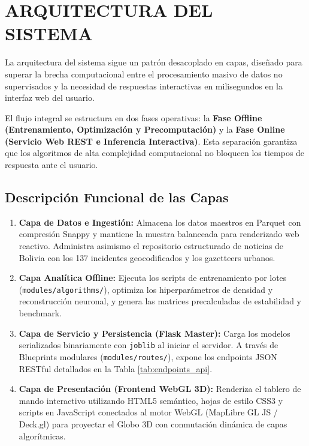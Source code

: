 \section{ARQUITECTURA DEL SISTEMA}

La arquitectura del sistema sigue un patrón desacoplado en capas, diseñado para superar la brecha computacional entre el procesamiento masivo de datos no supervisados y la necesidad de respuestas interactivas en milisegundos en la interfaz web del usuario.

El flujo integral se estructura en dos fases operativas: la \textbf{Fase Offline (Entrenamiento, Optimización y Precomputación)} y la \textbf{Fase Online (Servicio Web REST e Inferencia Interactiva)}. Esta separación garantiza que los algoritmos de alta complejidad computacional no bloqueen los tiempos de respuesta ante el usuario.

\subsection{Descripción Funcional de las Capas}

\begin{enumerate}
    \item \textbf{Capa de Datos e Ingestión:} Almacena los datos maestros en Parquet con compresión Snappy y mantiene la muestra balanceada para renderizado web reactivo. Administra asimismo el repositorio estructurado de noticias de Bolivia con los 137 incidentes geocodificados y los gazetteers urbanos.
    \item \textbf{Capa Analítica Offline:} Ejecuta los scripts de entrenamiento por lotes (\texttt{modules/\allowbreak algorithms/}), optimiza los hiperparámetros de densidad y reconstrucción neuronal, y genera las matrices precalculadas de estabilidad y benchmark.
    \item \textbf{Capa de Servicio y Persistencia (Flask Master):} Carga los modelos serializados binariamente con \texttt{joblib} al iniciar el servidor. A través de Blueprints modulares (\texttt{modules/routes/}), expone los endpoints JSON RESTful detallados en la Tabla \ref{tab:endpoints_api}.
    \item \textbf{Capa de Presentación (Frontend WebGL 3D):} Renderiza el tablero de mando interactivo utilizando HTML5 semántico, hojas de estilo CSS3 y scripts en JavaScript conectados al motor WebGL (MapLibre GL JS / Deck.gl) para proyectar el Globo 3D con conmutación dinámica de capas algorítmicas.
\end{enumerate}

